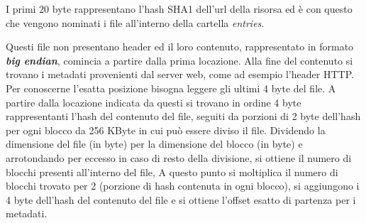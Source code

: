 \begin{table}[H]
	\begin{center}
		\end{center}
		\caption{Firefox: struttura di un indirizzo cache}
\end{table}

\begin{table}[H]
	\begin{center}
		\end{center}
		\caption{Firefox: esempio di un indirizzo cache}
	\end{table}

I primi 20 byte rappresentano l'hash SHA1 dell'url della risorsa ed è con questo che vengono nominati i file all'interno della cartella \textit{entries}.

Questi file non presentano header ed il loro contenuto, rappresentato in formato \textbf{\textit{big endian}}, comincia a partire dalla prima locazione.
Alla fine del contenuto si trovano i metadati provenienti dal server web, come ad esempio l'header HTTP. Per conoscerne l'esatta posizione bisogna leggere gli ultimi 4 byte del file.
A partire dalla locazione indicata da questi si trovano in ordine 4 byte rappresentanti l'hash del contenuto del file, seguiti da porzioni di 2 byte dell'hash per ogni blocco da 256 KByte in cui può essere diviso il file.  
Dividendo la dimensione del file (in byte) per la dimensione del blocco (in byte) e arrotondando per eccesso in caso di resto della divisione, si ottiene il numero di blocchi presenti all'interno del file,  
A questo punto si moltiplica il numero di blocchi trovato per 2 (porzione di hash contenuta in ogni blocco), si aggiungono i 4 byte dell'hash del contenuto del file e si ottiene l'offset esatto di partenza per i metadati.

